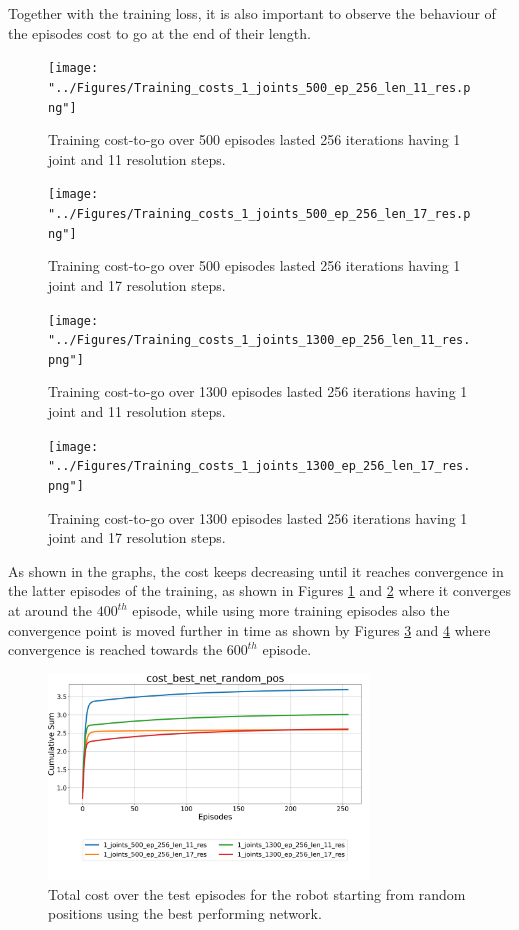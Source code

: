 \documentclass[twocolumn, a4paper]{article}
\begin{document}
Together with the training loss, it is also important to observe the behaviour
of the episodes cost to go at the end of their length.

\begin{figure}[H]
	\centering
	\texttt{[image: "../Figures/Training\_costs\_1\_joints\_500\_ep\_256\_len\_11\_res.png"]}
	\caption{Training cost-to-go over 500 episodes lasted 256 iterations having 1
			 joint and 11 resolution steps.}
	\label{fig:Train_cost_to_go_1_500_11}
\end{figure}

\begin{figure}[H]
	\texttt{[image: "../Figures/Training\_costs\_1\_joints\_500\_ep\_256\_len\_17\_res.png"]}
	\caption{Training cost-to-go over 500 episodes lasted 256 iterations having 1
			 joint and 17 resolution steps.}
	\label{fig:Train_cost_to_go_1_500_17}
\end{figure}

\begin{figure}[H]
	\texttt{[image: "../Figures/Training\_costs\_1\_joints\_1300\_ep\_256\_len\_11\_res.png"]}
	\caption{Training cost-to-go over 1300 episodes lasted 256 iterations having 1
			 joint and 11 resolution steps.}
	\label{fig:Train_cost_to_go_1_1300_11}
\end{figure}
\begin{figure}[H]
	\texttt{[image: "../Figures/Training\_costs\_1\_joints\_1300\_ep\_256\_len\_17\_res.png"]}
	\caption{Training cost-to-go over 1300 episodes lasted 256 iterations having 1
			 joint and 17 resolution steps.}
	\label{fig:Train_cost_to_go_1_1300_17}
\end{figure}

As shown in the graphs, the cost keeps decreasing until it reaches convergence
in the latter episodes of the training, as shown in Figures
\ref{fig:Train_cost_to_go_1_500_11} and \ref{fig:Train_cost_to_go_1_500_17}
where it converges at around the $400^{th}$ episode, while using more
training episodes also the convergence point is moved further in time as shown
by Figures \ref{fig:Train_cost_to_go_1_1300_11} and
\ref{fig:Train_cost_to_go_1_1300_17}
where convergence is reached towards the $600^{th}$ episode.

\begin{figure}[H]
	\centering
	\includegraphics[width=8.5cm]{"../Figures/Summary_cost_best_net_random_pos_1J.png"}
	\caption{Total cost over the test episodes for the robot starting from
			 random positions using the best performing network.}
	\label{fig:Test_1_best_net_random_pos}
\end{figure}
\end{document}
